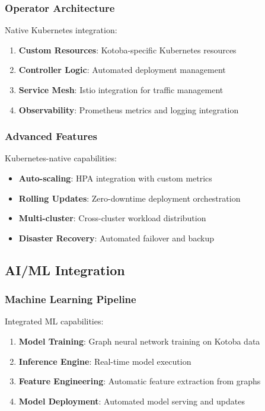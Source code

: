 \documentclass[11pt,a4paper]{article}
\begin{document}
\subsubsection{Operator Architecture}
\label{subsubsec:k8s_architecture}

Native Kubernetes integration:

\begin{enumerate}
\item \textbf{Custom Resources}: Kotoba-specific Kubernetes resources
\item \textbf{Controller Logic}: Automated deployment management
\item \textbf{Service Mesh}: Istio integration for traffic management
\item \textbf{Observability}: Prometheus metrics and logging integration
\end{enumerate}

\subsubsection{Advanced Features}
\label{subsubsec:k8s_features}

Kubernetes-native capabilities:

\begin{itemize}
\item \textbf{Auto-scaling}: HPA integration with custom metrics
\item \textbf{Rolling Updates}: Zero-downtime deployment orchestration
\item \textbf{Multi-cluster}: Cross-cluster workload distribution
\item \textbf{Disaster Recovery}: Automated failover and backup
\end{itemize}

\subsection{AI/ML Integration}
\label{subsec:ai_integration}

\subsubsection{Machine Learning Pipeline}
\label{subsubsec:ml_pipeline}

Integrated ML capabilities:

\begin{enumerate}
\item \textbf{Model Training}: Graph neural network training on Kotoba data
\item \textbf{Inference Engine}: Real-time model execution
\item \textbf{Feature Engineering}: Automatic feature extraction from graphs
\item \textbf{Model Deployment}: Automated model serving and updates
\end{enumerate}
\end{document}

